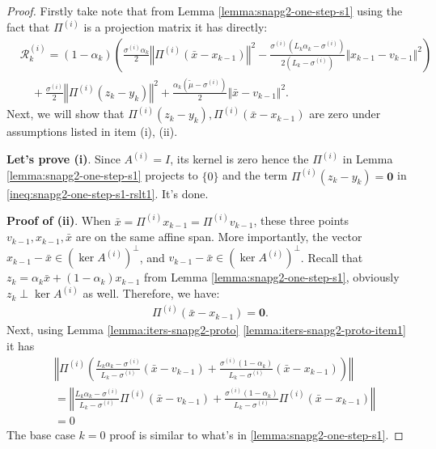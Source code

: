 \documentclass[12pt]{article}
\begin{document}
    \begin{proof}
        Firstly take note that from Lemma \ref{lemma:snapg2-one-step-s1} using the fact that $\Pi^{(i)}$ is a projection matrix it has directly: 
        \begin{align*}
            & \mathcal R_k^{(i)} = (1 - \alpha_k)\left(
                \frac{\sigma^{(i)}\alpha_k}{2}\left\Vert \Pi^{(i)} (\bar x - x_{k - 1})\right\Vert^2
                - \frac{\sigma^{(i)}\left(L_k\alpha_k - \sigma^{(i)}\right)}{2\left(L_k - \sigma^{(i)}\right)}\Vert x_{k - 1} - v_{k - 1} \Vert^2
            \right)
                \\&\quad
                + \frac{\sigma^{(i)}}{2}\left\Vert \Pi^{(i)}(z_k - y_k)\right\Vert^2
                + \frac{\alpha_k(\tilde\mu - \sigma^{(i)})}{2} \Vert \bar x - v_{k - 1}\Vert^2. 
        \end{align*}
        Next, we will show that $\Pi^{(i)}(z_k - y_k), \Pi^{(i)}(\bar x - x_{k - 1})$ are zero under assumptions listed in item (i), (ii). 
        \par
        \textbf{Let's prove (i)}. 
        Since $A^{(i)} = I$, its kernel is zero hence the $\Pi^{(i)}$ in Lemma \ref{lemma:snapg2-one-step-s1} projects to $\{0\}$ and the term $\Pi^{(i)}(z_k - y_k) = \mathbf 0$ in \eqref{ineq:snapg2-one-step-s1-rslt1}. It's done. 
        \par
        \textbf{Proof of (ii)}. 
        When $\bar x = \Pi^{(i)} x_{k - 1} = \Pi^{(i)} v_{k - 1}$, these three points $v_{k - 1}, x_{k - 1}, \bar x$ are on the same affine span. 
        More importantly, the vector $x_{k - 1} - \bar x \in (\ker A^{(i)})^{\perp}$, and $v_{k - 1} - \bar x \in (\ker A^{(i)})^{\perp}$. 
        Recall that $z_k = \alpha_k \bar x + (1 - \alpha_k) x_{k - 1}$ from Lemma \ref{lemma:snapg2-one-step-s1}, obviously $z_k \perp \ker A^{(i)}$ as well. 
        Therefore, we have: 
        \begin{align*}
            \Pi^{(i)}(\bar x - x_{k - 1}) = \mathbf 0. 
        \end{align*}
        Next, using Lemma \ref{lemma:iters-snapg2-proto} \ref{lemma:iters-snapg2-proto-item1} it has 
        \begin{align*}
            & \left\Vert
                \Pi^{(i)} \left(
                    \frac{L_k\alpha_k - \sigma^{(i)}}{L_k - \sigma^{(i)}}(\bar x - v_{k - 1})
                    + \frac{\sigma^{(i)}(1 - \alpha_k)}{L_k - \sigma^{(i)}}(\bar x - x_{k - 1})
                \right)
            \right\Vert
            \\
            &= 
            \left\Vert
                \frac{L_k\alpha_k - \sigma^{(i)}}{L_k - \sigma^{(i)}}\Pi^{(i)}(\bar x - v_{k - 1})
                + 
                \frac{\sigma^{(i)}(1 - \alpha_k)}{L_k - \sigma^{(i)}}\Pi^{(i)}(\bar x - x_{k - 1})
            \right\Vert
            \\
            &= 0
        \end{align*}
        The base case $k = 0$ proof is similar to what's in \ref{lemma:snapg2-one-step-s1}. 
    \end{proof}
\end{document}
